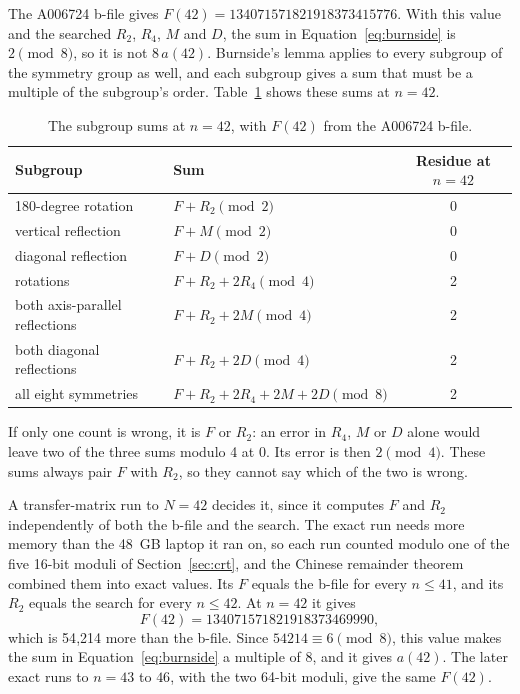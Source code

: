 \documentclass[11pt]{a000104}
\numberwithin{equation}{section}
\begin{document}
The A006724 b-file gives $F(42) = 134071571821918373415776$.
With this value and the searched $R_2$, $R_4$, $M$ and $D$, the sum in Equation~\eqref{eq:burnside} is $2 \pmod 8$, so it is not $8\,a(42)$.
Burnside's lemma applies to every subgroup of the symmetry group as well, and each subgroup gives a sum that must be a multiple of the subgroup's order.
Table~\ref{tab:subgroups} shows these sums at $n = 42$.

\begin{table}[!htbp]
  \centering
  \begin{tabular}{llc}
    \toprule
    Subgroup & Sum & Residue at $n = 42$ \\
    \midrule
    180-degree rotation & $F + R_2 \pmod 2$ & 0 \\
    vertical reflection & $F + M \pmod 2$ & 0 \\
    diagonal reflection & $F + D \pmod 2$ & 0 \\
    rotations & $F + R_2 + 2R_4 \pmod 4$ & 2 \\
    both axis-parallel reflections & $F + R_2 + 2M \pmod 4$ & 2 \\
    both diagonal reflections & $F + R_2 + 2D \pmod 4$ & 2 \\
    all eight symmetries & $F + R_2 + 2R_4 + 2M + 2D \pmod 8$ & 2 \\
    \bottomrule
  \end{tabular}
  \caption{The subgroup sums at $n = 42$, with $F(42)$ from the A006724 b-file.}
  \label{tab:subgroups}
\end{table}

If only one count is wrong, it is $F$ or $R_2$: an error in $R_4$, $M$ or $D$ alone would leave two of the three sums modulo 4 at $0$.
Its error is then $2 \pmod 4$.
These sums always pair $F$ with $R_2$, so they cannot say which of the two is wrong.

A transfer-matrix run to $N = 42$ decides it, since it computes $F$ and $R_2$ independently of both the b-file and the search.
The exact run needs more memory than the 48~GB laptop it ran on, so each run counted modulo one of the five 16-bit moduli of Section~\ref{sec:crt}, and the Chinese remainder theorem combined them into exact values.
Its $F$ equals the b-file for every $n \le 41$, and its $R_2$ equals the search for every $n \le 42$.
At $n = 42$ it gives
\[
  F(42) = 134071571821918373469990,
\]
which is 54{,}214 more than the b-file.
Since $54214 \equiv 6 \pmod 8$, this value makes the sum in Equation~\eqref{eq:burnside} a multiple of 8, and it gives $a(42)$.
The later exact runs to $n = 43$ to $46$, with the two 64-bit moduli, give the same $F(42)$.
\end{document}
